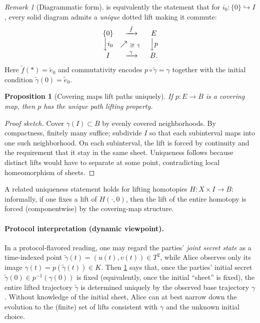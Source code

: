 \documentclass[11pt,a4paper]{article}
\newtheorem{proposition}[theorem]{Proposition}
\theoremstyle{definition}
\theoremstyle{remark}
\newtheorem{remark}[theorem]{Remark}
\begin{document}
\begin{remark}[Diagrammatic form]
\label{rem:uplp-diagram}
 is equivalently the statement that for \(i_0:\{0\}\hookrightarrow I\), every solid diagram admits a \emph{unique} dotted lift making it commute:
\[
\begin{array}{ccc}
\{0\} & \xrightarrow{\ \tilde f\ } & E \\
\Big\downarrow {i_0} & \nearrow_{\ \exists!\ \tilde \gamma\ } & \Big\downarrow {p} \\
I & \xrightarrow{\ \gamma\ } & B.
\end{array}
\]
Here \(\tilde f(*)=\tilde e_0\) and commutativity encodes \(p\circ \tilde\gamma=\gamma\) together with the initial condition \(\tilde\gamma(0)=\tilde e_0\).
\end{remark}

\begin{proposition}[Covering maps lift paths uniquely]
\label{prop:covering-uplp}
If \(p:E\to B\) is a covering map, then \(p\) has the unique path lifting property.
\end{proposition}

\begin{proof}[Proof sketch]
Cover \(\gamma(I)\subset B\) by evenly covered neighborhoods. By compactness, finitely many suffice; subdivide \(I\) so that each subinterval maps into one such neighborhood. On each subinterval, the lift is forced by continuity and the requirement that it stay in the same sheet. Uniqueness follows because distinct lifts would have to separate at some point, contradicting local homeomorphism of sheets.
\end{proof}

A related uniqueness statement holds for lifting homotopies \(H:X\times I\to B\): informally, if one fixes a lift of \(H(\cdot,0)\), then the lift of the entire homotopy is forced (componentwise) by the covering-map structure.

\paragraph{Protocol interpretation (dynamic viewpoint).}
In a protocol-flavored reading, one may regard the parties' \emph{joint secret state} as a time-indexed point \(\tilde\gamma(t)=(u(t),v(t))\in T^2\), while Alice observes only its image \(\gamma(t)=p(\tilde\gamma(t))\in K\). Then \cref{prop:covering-uplp} says that, once the parties' initial secret \(\tilde\gamma(0)\in p^{-1}(\gamma(0))\) is fixed (equivalently, once the initial ``sheet'' is fixed), the entire lifted trajectory \(\tilde\gamma\) is determined uniquely by the observed base trajectory \(\gamma\). Without knowledge of the initial sheet, Alice can at best narrow down the evolution to the (finite) set of lifts consistent with \(\gamma\) and the unknown initial choice.
\end{document}

